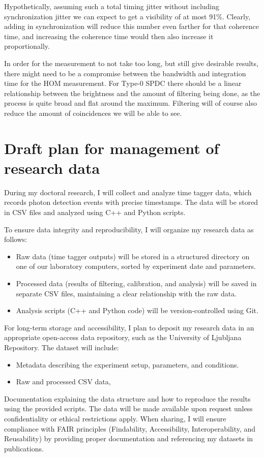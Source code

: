 \documentclass{article}
\theoremstyle{mytheoremstyle}
\theoremstyle{mytheoremstyle}
\theoremstyle{myproblemstyle}
\begin{document}
Hypothetically, assuming such a total timing jitter without including synchronization jitter we can expect to get a visibility of at most 91\%. Clearly,
adding in synchronization will reduce this number even farther for that coherence time, and increasing the coherence time would then also increase it proportionally.
\par In order for the measurement to not take too long, but still give desirable results, there might need to be a compromise
between the bandwidth and integration time for the HOM measurement. For Type-0 SPDC there should be a linear relationship between the brightness
and the amount of filtering being done, as the process is quite broad and flat around the maximum.
Filtering will of course also reduce the amount of coincidences we will be able to see.


\section{Draft plan for management of research data}
During my doctoral research, I will collect and analyze time tagger data,
which records photon detection events with precise timestamps.
The data will be stored in CSV files and analyzed using C++ and Python scripts.

To ensure data integrity and reproducibility, I will organize my research data as follows:
\begin{itemize}
	\item Raw data (time tagger outputs) will be stored in a structured directory on one of our laboratory computers, sorted by experiment date and parameters.
	\item Processed data (results of filtering, calibration, and analysis) will be saved in separate CSV files, maintaining a clear relationship with the raw data.
	\item Analysis scripts (C++ and Python code) will be version-controlled using Git.
\end{itemize}
For long-term storage and accessibility, I plan to deposit my research data in an appropriate open-access data repository,
such as the University of Ljubljana Repository. The dataset will include:

\begin{itemize}
	\item Metadata describing the experiment setup, parameters, and conditions.
	\item Raw and processed CSV data,
\end{itemize}

Documentation explaining the data structure and how to reproduce the results using the provided scripts.
The data will be made available upon request unless confidentiality or ethical restrictions apply.
When sharing, I will ensure compliance with FAIR principles (Findability, Accessibility,
Interoperability, and Reusability) by providing proper documentation and referencing my datasets in publications.
\newpage


\end{document}
